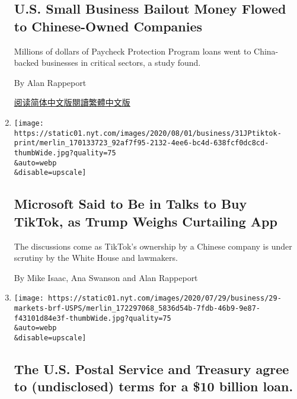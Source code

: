 \begin{enumerate}
{  \subsection{U.S. Small Business Bailout Money Flowed to Chinese-Owned
  Companies}\label{us-small-business-bailout-money-flowed-to-chinese-owned-companies}}

  Millions of dollars of Paycheck Protection Program loans went to
  China-backed businesses in critical sectors, a study found.

  By Alan Rappeport

  \href{https://cn.nytimes.com/usa/20200803/virus-china-ppp-small-business-loans/}{阅读简体中文版}\href{https://cn.nytimes.com/usa/20200803/virus-china-ppp-small-business-loans/zh-hant/}{閱讀繁體中文版}
\item
  \href{/2020/07/31/technology/tiktok-microsoft.html}{}

  \texttt{[image: https://static01.nyt.com/images/2020/08/01/business/31JPtiktok-print/merlin\_170133723\_92af7f95-2132-4ee6-bc4d-638fcf0dc8cd-thumbWide.jpg?quality=75\\\&auto=webp\\\&disable=upscale]}

  \hypertarget{microsoft-said-to-be-in-talks-to-buy-tiktok-as-trump-weighs-curtailing-app}{%
  \subsection{Microsoft Said to Be in Talks to Buy TikTok, as Trump
  Weighs Curtailing
  App}\label{microsoft-said-to-be-in-talks-to-buy-tiktok-as-trump-weighs-curtailing-app}}

  The discussions come as TikTok's ownership by a Chinese company is
  under scrutiny by the White House and lawmakers.

  By Mike Isaac, Ana Swanson and Alan Rappeport
\item
  \href{/live/2020/07/29/business/stock-market-today-coronavirus/the-us-postal-service-and-treasury-agree-to-undisclosed-terms-for-a-10-billion-loan}{}

  \texttt{[image: https://static01.nyt.com/images/2020/07/29/business/29-markets-brf-USPS/merlin\_172297068\_5836d54b-7fdb-46b9-9e87-f43101d84e3f-thumbWide.jpg?quality=75\\\&auto=webp\\\&disable=upscale]}

  \hypertarget{the-us-postal-service-and-treasury-agree-to-undisclosed-terms-for-a-10-billion-loan}{%
  \subsection{The U.S. Postal Service and Treasury agree to
  (undisclosed) terms for a \$10 billion
  loan.}\label{the-us-postal-service-and-treasury-agree-to-undisclosed-terms-for-a-10-billion-loan}}


\end{enumerate}
